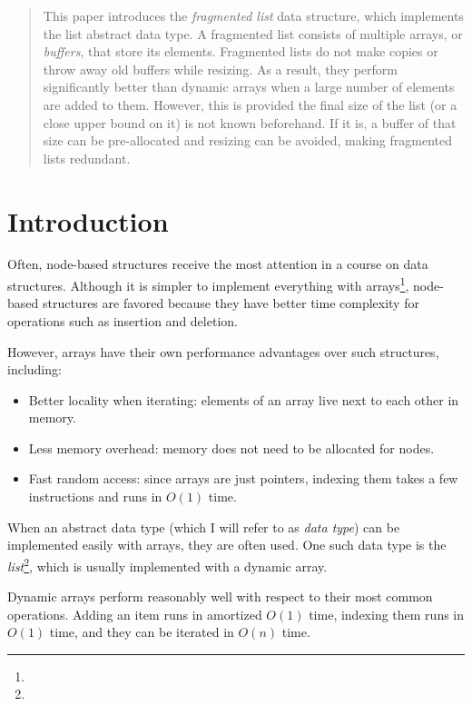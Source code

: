 \documentclass{article}
\begin{document}
	\begin{abstract}
		This paper introduces the \textit{fragmented list} data structure, which implements the list abstract data type. A fragmented list consists of multiple arrays, or \textit{buffers}, that store its elements. Fragmented lists do not make copies or throw away old buffers while resizing. As a result, they perform significantly better than dynamic arrays when a large number of elements are added to them. However, this is provided the final size of the list (or a close upper bound on it) is not known beforehand. If it is, a buffer of that size can be pre-allocated and resizing can be avoided, making fragmented lists redundant.
	\end{abstract}

	\section{Introduction}
	\label{Introduction}
	
	Often, node-based structures receive the most attention in a course on data structures. Although it is simpler to implement everything with arrays\footnote{}, node-based structures are favored because they have better time complexity for operations such as insertion and deletion.

	However, arrays have their own performance advantages over such structures, including:
	
	\begin{itemize}
		\item Better locality when iterating: elements of an array live next to each other in memory.
		\item Less memory overhead: memory does not need to be allocated for nodes.
		\item Fast random access: since arrays are just pointers, indexing them takes a few instructions and runs in $O(1)$ time.
	\end{itemize}

	When an abstract data type (which I will refer to as \textit{data type}) can be implemented easily with arrays, they are often used. One such data type is the \textit{list}\footnote{}, which is usually implemented with a dynamic array.

	Dynamic arrays perform reasonably well with respect to their most common operations. Adding an item runs in amortized $O(1)$ time, indexing them runs in $O(1)$ time, and they can be iterated in $O(n)$ time.
	
\end{document}
